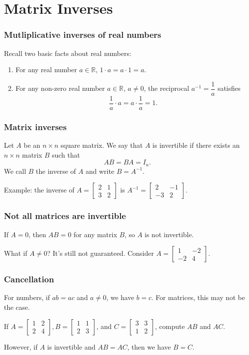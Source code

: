 \documentclass[11pt,t]{beamer}
\newcommand{\R}{\mathbb{R}}
\begin{document}
\section{Matrix Inverses}
\begin{frame}\frametitle{Mutliplicative inverses of real numbers}
Recall two basic facts about real numbers:
\begin{enumerate}
\item For any real number $a\in\R$, $1\cdot a = a\cdot 1 = a$.
\item For any non-zero real number $a\in \R$, $a\neq 0$, the \alert{reciprocal} $a^{-1} = \dfrac{1}{a}$ satisfies
\[
\frac{1}{a}\cdot a = a\cdot\frac{1}{a} = 1.
\]

\end{enumerate}

\end{frame}

\begin{frame}\frametitle{Matrix inverses}
\begin{definition}
Let $A$ be an $n\times n$ \alert{square} matrix. We say that $A$ is \alert{invertible} if there exists an $n\times n$ matrix $B$ such that
\[
AB = BA = I_n.
\]
We call $B$ the \alert{inverse} of $A$ and write $B=A^{-1}$.
\end{definition}

\bigskip

Example: the inverse of $A = \begin{bmatrix}2&1\\3&2\end{bmatrix}$ is $A^{-1} = \begin{bmatrix}2&-1\\-3&2\end{bmatrix}$.
\end{frame}
\begin{frame}\frametitle{Not all matrices are invertible}
If $A=0$, then $AB=0$ for any matrix $B$, so $A$ is not invertible.

What if $A\neq 0$? It's still not guaranteed. Consider $A = \begin{bmatrix}
1&-2\\-2&4
\end{bmatrix}$.
\end{frame}
\begin{frame}\frametitle{Cancellation}
 For \alert{numbers}, if $ab=ac$ and $a\neq 0$, we have $b=c$. For \alert{matrices}, this may not be the case.
\begin{example}
 If $A = \begin{bmatrix}1&2\\2&4\end{bmatrix}, B = \begin{bmatrix}1&1\\2&3\end{bmatrix}$, and $C = \begin{bmatrix}3&3\\1&2\end{bmatrix}$, compute $AB$ and $AC$.
\end{example}
 However, if $A$ is \alert{invertible} and $AB=AC$, then we have $B=C$.
\end{frame}
\end{document}
